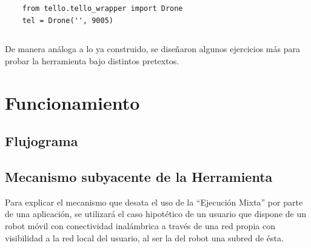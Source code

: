 \begin{verbatim}
    from tello.tello_wrapper import Drone
    tel = Drone('', 9005)
\end{verbatim}
\begin{lstlisting}[caption=Uso del Driver]
\end{lstlisting}


De manera análoga a lo ya construido, se diseñaron algunos ejercicios más para probar la herramienta bajo distintos pretextos.

\section{Funcionamiento}
\subsection{Flujograma}



\subsection{Mecanismo subyacente de la Herramienta}

Para explicar el mecanismo que desata el uso de la ``Ejecución Mixta'' por parte de una aplicación, se utilizará el caso hipotético de un usuario que dispone de un robot móvil con conectividad inalámbrica a través de una red propia con visibilidad a la red local del usuario, al ser la del robot una subred de ésta.


